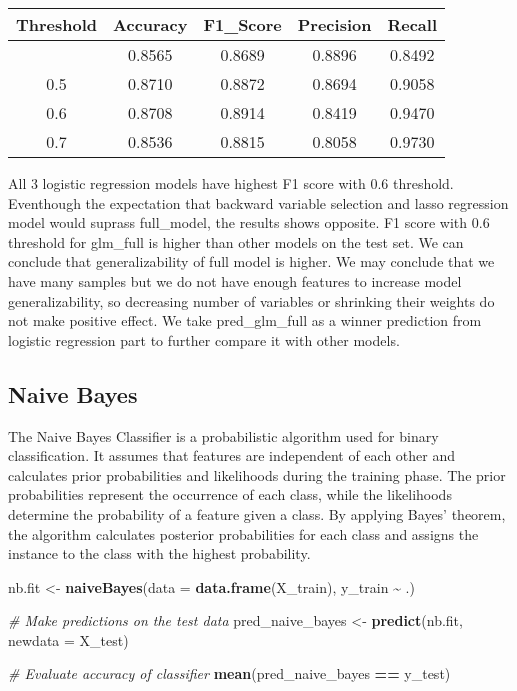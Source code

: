 \documentclass[
]{article}
\newenvironment{Shaded}{\begin{snugshade}}{\end{snugshade}}
\newcommand{\AttributeTok}[1]{\textcolor[rgb]{0.13,0.29,0.53}{#1}}
\newcommand{\CommentTok}[1]{\textcolor[rgb]{0.56,0.35,0.01}{\textit{#1}}}
\newcommand{\FunctionTok}[1]{\textcolor[rgb]{0.13,0.29,0.53}{\textbf{#1}}}
\newcommand{\NormalTok}[1]{#1}
\newcommand{\OtherTok}[1]{\textcolor[rgb]{0.56,0.35,0.01}{#1}}
\newcommand{\SpecialCharTok}[1]{\textcolor[rgb]{0.81,0.36,0.00}{\textbf{#1}}}
\begin{document}
\begin{longtable}[]{@{}ccccc@{}}
\toprule\noalign{}
Threshold & Accuracy & F1\_Score & Precision & Recall \\
\midrule\noalign{}
\endhead
\bottomrule\noalign{}
\endlastfoot
0.4 & 0.8565 & 0.8689 & 0.8896 & 0.8492 \\
0.5 & 0.8710 & 0.8872 & 0.8694 & 0.9058 \\
0.6 & 0.8708 & 0.8914 & 0.8419 & 0.9470 \\
0.7 & 0.8536 & 0.8815 & 0.8058 & 0.9730 \\
\end{longtable}

All 3 logistic regression models have highest F1 score with 0.6
threshold. Eventhough the expectation that backward variable selection
and lasso regression model would suprass full\_model, the results shows
opposite. F1 score with 0.6 threshold for glm\_full is higher than other
models on the test set. We can conclude that generalizability of full
model is higher. We may conclude that we have many samples but we do not
have enough features to increase model generalizability, so decreasing
number of variables or shrinking their weights do not make positive
effect. We take pred\_glm\_full as a winner prediction from logistic
regression part to further compare it with other models.

\hypertarget{naive-bayes}{%
\subsection{Naive Bayes}\label{naive-bayes}}

The Naive Bayes Classifier is a probabilistic algorithm used for binary
classification. It assumes that features are independent of each other
and calculates prior probabilities and likelihoods during the training
phase. The prior probabilities represent the occurrence of each class,
while the likelihoods determine the probability of a feature given a
class. By applying Bayes' theorem, the algorithm calculates posterior
probabilities for each class and assigns the instance to the class with
the highest probability.

\begin{Shaded}
\begin{Highlighting}[]
\NormalTok{nb.fit }\OtherTok{\textless{}{-}} \FunctionTok{naiveBayes}\NormalTok{(}\AttributeTok{data =} \FunctionTok{data.frame}\NormalTok{(X\_train),}
\NormalTok{                     y\_train }\SpecialCharTok{\textasciitilde{}}\NormalTok{ .)}

\CommentTok{\# Make predictions on the test data}
\NormalTok{pred\_naive\_bayes }\OtherTok{\textless{}{-}} \FunctionTok{predict}\NormalTok{(nb.fit, }\AttributeTok{newdata =}\NormalTok{ X\_test)}

\CommentTok{\# Evaluate accuracy of classifier}
\FunctionTok{mean}\NormalTok{(pred\_naive\_bayes }\SpecialCharTok{==}\NormalTok{ y\_test)}
\end{Highlighting}
\end{Shaded}
\end{document}
